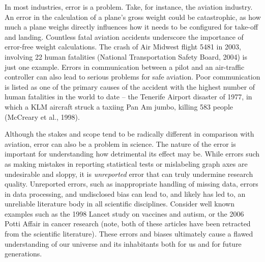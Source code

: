 \documentclass[authordate, empirical]{jote-new-article}
\author[1]{\mbox{Sarahanne Field\orcid{0000-0001-7874-1261}}}
\affil[1]{University of Groningen}
\begin{document}
\begin{frontmatter}
  \maketitle
  \begin{abstract}
    \printabstracttext
  \end{abstract}
\end{frontmatter}


	






	In most industries, error is a problem. Take, for instance, the aviation industry. An error in the calculation of a plane's gross weight could be catastrophic, as how much a plane weighs directly influences how it needs to be configured for take-off and landing. Countless fatal aviation accidents underscore the importance of error-free weight calculations. The crash of Air Midwest flight 5481 in 2003, involving 22 human fatalities (National Transportation Safety Board, 2004) is just one example. Errors in communication between a pilot and an air-traffic controller can also lead to serious problems for safe aviation. Poor communication is listed as one of the primary causes of the accident with the highest number of human fatalities in the world to date -- the Tenerife Airport disaster of 1977, in which a KLM aircraft struck a taxiing Pan Am jumbo, killing 583 people (McCreary et al., 1998).



	Although the stakes and scope tend to be radically different in comparison with aviation, error can also be a problem in science. The nature of the error is important for understanding how detrimental its effect may be. While errors such as making mistakes in reporting statistical tests or mislabeling graph axes are undesirable and sloppy, it is \emph{unreported} error that can truly undermine research quality. Unreported errors, such as inappropriate handling of missing data, errors in data processing, and undisclosed bias can lead to, and likely has led to, an unreliable literature body in all scientific disciplines. Consider well known examples such as the 1998 Lancet study on vaccines and autism, or the 2006 Potti Affair in cancer research (note, both of these articles have been retracted from the scientific literature)\emph{.} These errors and biases ultimately cause a flawed understanding of our universe and its inhabitants both for us and for future generations.
\end{document}
